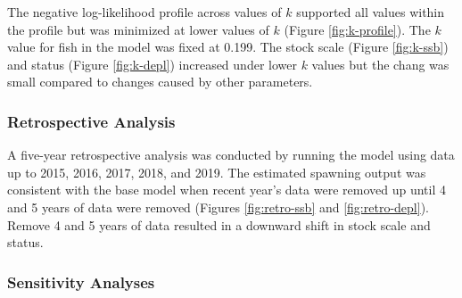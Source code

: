 \documentclass[11pt,
  english,
  a4paper,
]{article}
\begin{document}

The negative log-likelihood profile across values of {\(k\)\leavevmode\tagmcend\tagstructend} supported all values within the profile but was minimized at lower values of {\(k\)\leavevmode\tagmcend\tagstructend} (Figure \ref{fig:k-profile}). The {\(k\)\leavevmode\tagmcend\tagstructend} value for fish in the model was fixed at 0.199. The stock scale (Figure \ref{fig:k-ssb}) and status (Figure \ref{fig:k-depl}) increased under lower {\(k\)\leavevmode\tagmcend\tagstructend} values but the chang was small compared to changes caused by other parameters.

\leavevmode\tagmcend\tagstructend\par


\hypertarget{retrospective-analysis}{%
\subsubsection{Retrospective Analysis}\label{retrospective-analysis}}

\leavevmode\tagmcend\tagstructend


A five-year retrospective analysis was conducted by running the model using data up to 2015, 2016, 2017, 2018, and 2019. The estimated spawning output was consistent with the base model when recent year's data were removed up until 4 and 5 years of data were removed (Figures \ref{fig:retro-ssb} and \ref{fig:retro-depl}). Remove 4 and 5 years of data resulted in a downward shift in stock scale and status.

\leavevmode\tagmcend\tagstructend\par


\hypertarget{sensitivity-analyses}{%
\subsubsection{Sensitivity Analyses}\label{sensitivity-analyses}}

\leavevmode\tagmcend\tagstructend

\end{document}
